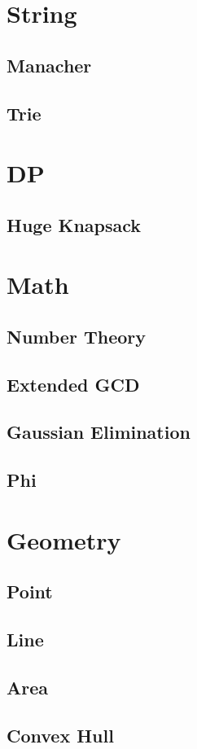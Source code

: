 \section{String}
    \subsection{Manacher}
        
    \subsection{Trie}
        

\section{DP}
    \subsection{Huge Knapsack}
        

\section{Math}
    \subsection{Number Theory}
        
    \subsection{Extended GCD}
        
    \subsection{Gaussian Elimination}
        
    \subsection{Phi}
        

\section{Geometry}
    \subsection{Point}
        
    \subsection{Line}
        
    \subsection{Area}
        
    \subsection{Convex Hull}
        
